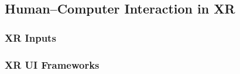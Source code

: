 \subsection{Human–Computer Interaction in XR}

\subsubsection{XR Inputs}

\subsubsection{XR UI Frameworks}
